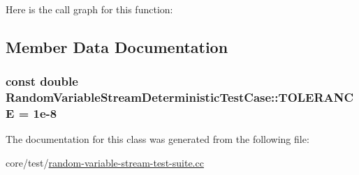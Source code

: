 Here is the call graph for this function\+:




\subsection{Member Data Documentation}
\subsubsection[{\texorpdfstring{T\+O\+L\+E\+R\+A\+N\+CE}{TOLERANCE}}]{\setlength{\rightskip}{0pt plus 5cm}const double Random\+Variable\+Stream\+Deterministic\+Test\+Case\+::\+T\+O\+L\+E\+R\+A\+N\+CE = 1e-\/8\hspace{0.3cm}{\ttfamily [static]}}\hypertarget{classRandomVariableStreamDeterministicTestCase_aa1cf92085bcc0ffa800f46707b1b29d8}{}\label{classRandomVariableStreamDeterministicTestCase_aa1cf92085bcc0ffa800f46707b1b29d8}


The documentation for this class was generated from the following file\+:\begin{DoxyCompactItemize}
\item 
core/test/\hyperlink{random-variable-stream-test-suite_8cc}{random-\/variable-\/stream-\/test-\/suite.\+cc}\end{DoxyCompactItemize}
